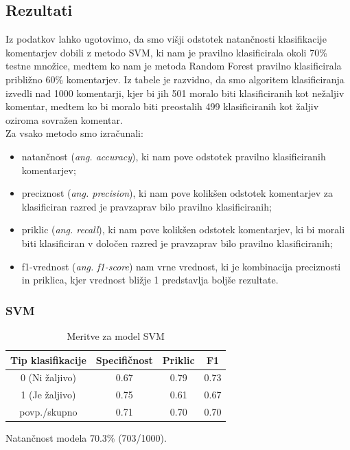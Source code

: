 \documentclass{acm_proc_article-sp}
\begin{document}
\subsection{Rezultati}
Iz podatkov lahko ugotovimo, da smo višji odstotek natančnosti klasifikacije komentarjev dobili z metodo SVM, ki nam je pravilno klasificirala okoli 70\% testne množice, medtem ko nam je metoda Random Forest pravilno klasificirala približno 60\% komentarjev.
Iz tabele je razvidno, da smo algoritem klasificiranja izvedli nad 1000 komentarji, kjer bi jih 501 moralo biti klasificiranih kot nežaljiv komentar, medtem ko bi moralo biti preostalih 499 klasificiranih kot žaljiv oziroma sovražen komentar.\\
Za vsako metodo smo izračunali:
\begin{itemize}
	\item natančnost ({\it ang. accuracy}), ki nam pove odstotek pravilno klasificiranih komentarjev;
	\item preciznost ({\it ang. precision}), ki nam pove kolikšen odstotek komentarjev za klasificiran razred je pravzaprav bilo pravilno klasificiranih;
	\item priklic ({\it ang. recall}), ki nam pove kolikšen odstotek komentarjev, ki bi morali biti klasificiran v določen razred je pravzaprav bilo pravilno klasificiranih;
	\item f1-vrednost ({\it ang. f1-score}) nam vrne vrednost, ki je kombinacija preciznosti in priklica, kjer vrednost bližje 1 predstavlja boljše rezultate.
\end{itemize}

\subsubsection{SVM}
\begin{table}[h!]
	\centering
	\caption{Meritve za model SVM}
	\begin{tabular}{|c|c|c|c|}
		\hline
		\textbf{Tip klasifikacije} & \textbf{Specifičnost} & \textbf{Priklic} & \textbf{F1} \\ \hline
		0 (Ni žaljivo) & 0.67 & 0.79 & 0.73 \\ \hline
		1 (Je žaljivo) & 0.75 & 0.61 & 0.67 \\ \hline \hline
		povp./skupno & 0.71 & 0.70 & 0.70 \\ \hline
	\end{tabular}
\end{table}
Natančnost modela 70.3\% (703/1000).
\end{document}

